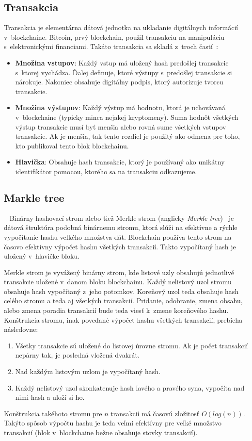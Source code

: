 \subsection{Transakcia}\label{subsec:transaction}
Transakcia je elementárna dátová jednotka na ukladanie digitálnych informácií v~blockchaine. Bitcoin, prvý blockchain, použil transakciu na manipuláciu s~elektronickými financiami. Takáto transakcia sa skladá z~troch častí~\cite{narayanan2016bitcoin}:
\begin{itemize}
	\item \textbf{Množina vstupov}: Každý vstup má uložený hash predošlej transakcie s~ktorej vychádza. Ďalej definuje, ktoré výstupy s~predošlej transakcie si nárokuje. Nakoniec obsahuje digitálny podpis, ktorý autorizuje tvorcu transakcie.
	\item \textbf{Množina výstupov}: Každý výstup má hodnotu, ktorá je uchovávaná v~blockchaine (typicky minca nejakej kryptomeny). Suma hodnôt všetkých výstup transakcie musí byť menšia alebo rovná sume všetkých vstupov transakcie. Ak je menšia, tak tento rozdiel je použitý ako odmena pre toho, kto publikoval tento blok blockchainu.
	\item \textbf{Hlavička}: Obsahuje hash transakcie, ktorý je používaný ako unikátny identifikátor pomocou, ktorého sa na transakciu odkazujeme.
\end{itemize}


\subsection{Markle tree}~\label{subsec:merkle-tree}
Binárny hashovací strom alebo tiež Merkle strom (anglicky \textit{Merkle tree})~\cite{merkleTreeBosamia} je dátová štruktúra podobná binárnemu stromu, ktorá slúži na efektívne a rýchle vypočítanie hashu veľkého množstva dát. Blockchain používa tento strom na časovo efektívny výpočet hashu všetkých transakcií. Takto vypočítaný hash je uložený v~hlavičke bloku.

Merkle strom je vyvážený binárny strom, kde listové uzly obsahujú jednotlivé transakcie uložené v~danom bloku blockchainu. Každý nelistový uzol stromu obsahuje hash vypočítaný z~jeho potomkov. Koreňový uzol teda obsahuje hash celého stromu a teda aj všetkých transakcií. Pridanie, odobranie, zmena obsahu, alebo zmena poradia transakcií bude teda viesť k~zmene koreňového hashu. Konštrukcia stromu, inak povedané výpočet hashu všetkých transakcií, prebieha následovne:
\begin{enumerate}
	\item Všetky transakcie sú uložené do listovej úrovne stromu. Ak je počet transakcií nepárny tak, je posledná vložená dvakrát.
	\item Nad každým listovým uzlom je vypočítaný hash.
	\item Každý nelistový uzol skonkatenuje hash ľavého a pravého syna, vypočíta nad nimi hash a uloží si ho. 
\end{enumerate}
Konštrukcia takéhoto stromu pre $n$ transakcií má časovú zložitosť $O(log(n))$. Takýto spôsob výpočtu hashu je teda veľmi efektívny pre veľké množstvo transakcií (blok v~blockchaine bežne obsahuje stovky transakcií).

